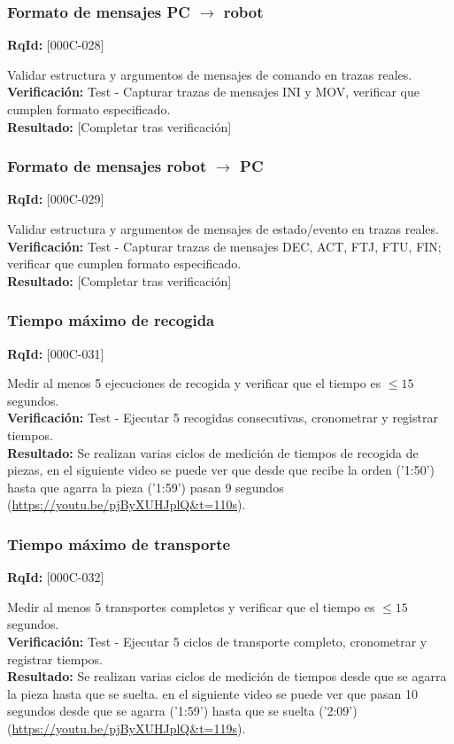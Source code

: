 \documentclass[12pt,a4paper]{article}
\begin{document}
\subsubsection{Formato de mensajes PC $\rightarrow$ robot}
\textbf{RqId:} [000C-028]
\vspace{0.3em}
\par Validar estructura y argumentos de mensajes de comando en trazas reales.
\\ \textbf{Verificación:} Test - Capturar trazas de mensajes INI y MOV, verificar que cumplen formato especificado.
\\ \textbf{Resultado:} [Completar tras verificación]

\subsubsection{Formato de mensajes robot $\rightarrow$ PC}
\textbf{RqId:} [000C-029]
\vspace{0.3em}
\par Validar estructura y argumentos de mensajes de estado/evento en trazas reales.
\\ \textbf{Verificación:} Test - Capturar trazas de mensajes DEC, ACT, FTJ, FTU, FIN; verificar que cumplen formato especificado.
\\ \textbf{Resultado:} [Completar tras verificación]

\subsubsection{Tiempo máximo de recogida}
\textbf{RqId:} [000C-031]
\vspace{0.3em}
\par Medir al menos 5 ejecuciones de recogida y verificar que el tiempo es $\leq 15$ segundos.
\\ \textbf{Verificación:} Test - Ejecutar 5 recogidas consecutivas, cronometrar y registrar tiempos.
\\ \textbf{Resultado:} Se realizan varias ciclos de medición de tiempos de recogida de piezas, en el siguiente video se puede ver que desde que recibe la orden ('1:50') hasta que agarra la pieza ('1:59') pasan 9 segundos (\url{https://youtu.be/pjByXUHJplQ&t=110s}).

\subsubsection{Tiempo máximo de transporte}
\textbf{RqId:} [000C-032]
\vspace{0.3em}
\par Medir al menos 5 transportes completos y verificar que el tiempo es $\leq 15$ segundos.
\\ \textbf{Verificación:} Test - Ejecutar 5 ciclos de transporte completo, cronometrar y registrar tiempos.
\\ \textbf{Resultado:} Se realizan varias ciclos de medición de tiempos desde que se agarra la pieza hasta que se suelta. en el siguiente video se puede ver que pasan 10 segundos desde que se agarra ('1:59') hasta que se suelta ('2:09') (\url{https://youtu.be/pjByXUHJplQ&t=119s}).
\end{document}
